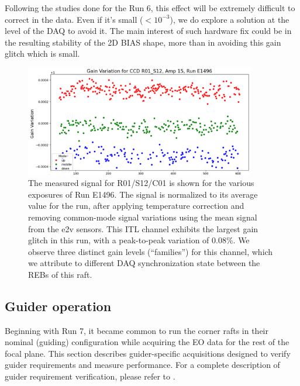 Following the studies done for the Run 6, this effect will be extremely difficult to correct in the data. Even if it's small ($<10^{-3}$), we do explore a solution at the level of the DAQ to avoid it. The main interest of such hardware fix could be in the resulting  stability of the 2D BIAS shape, more than in avoiding this gain glitch which is small. 

\begin{figure}[ht]
\begin{centering}
\includegraphics[width=0.9\textwidth]{figures/Gain_variation_R01_S12_amp15_E1496.png}
\end{centering}
\caption{The measured signal for R01/S12/C01 is shown for the various exposures of Run E1496. The signal is normalized to its average value for the run, after applying temperature correction and removing common-mode signal variations using the mean signal from the e2v sensors. This ITL channel exhibits the largest gain glitch in this run, with a peak-to-peak variation of 0.08\%. We observe three distinct gain levels (“families”) for this channel, which we attribute to different DAQ synchronization state between the REBs of this raft.}
\label{fig:ITLGglitch}
\end{figure}

\subsection{Guider operation}\label{guider-operation}
Beginning with Run 7, it became common to run the corner rafts in their nominal (guiding) configuration while acquiring the EO data for the rest of the focal plane. This section describes guider-specific acquisitions designed to verify guider requirements and measure performance. For a complete description of guider requirement verification, please refer to \citep{LCA-20583}.

